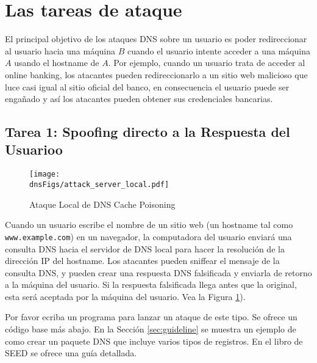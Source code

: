 \section{Las tareas de ataque}

El principal objetivo de los ataques DNS sobre un usuario es poder redireccionar al usuario hacia una máquina $B$ cuando el usuario intente acceder a una máquina $A$ usando el hostname de $A$. Por ejemplo, cuando un usuario trata de acceder al online banking, los atacantes pueden redireccionarlo a un sitio web malicioso que luce casi igual al sitio oficial del banco, en consecuencia el usuario puede ser engañado y así los atacantes pueden obtener sus credenciales bancarias.



\subsection{Tarea 1: Spoofing directo a la Respuesta del Usuarioo}



\begin{figure}[htb]
\centering
\texttt{[image: \\dnsFigs/attack\_server\_local.pdf]}
\caption{Ataque Local de DNS Cache Poisoning}
\label{dns:fig:local_attack}
\end{figure}

Cuando un usuario escribe el nombre de un sitio web (un hostname tal como {\tt
www.example.com}) en un navegador, la computadora del usuario enviará una consulta DNS hacia el servidor de DNS local para hacer la resolución de la dirección IP del hostname.
Los atacantes pueden sniffear el mensaje de la consulta DNS, y pueden crear una respuesta DNS falsificada y enviarla de retorno a la máquina del usuario. Si la respuesta falsificada llega antes que la original, esta será aceptada por la máquina del usuario.
Vea la Figura \ref{dns:fig:local_attack}). 

Por favor ecriba un programa para lanzar un ataque de este tipo. Se ofrece un código base más abajo. En la Sección \ref{sec:guideline} se muestra un ejemplo de como crear un paquete DNS que incluye varios tipos de registros. En el libro de SEED se ofrece una guía detallada.


